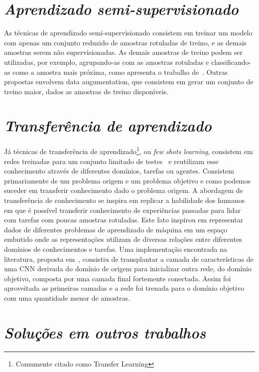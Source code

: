 \section{\textit{Aprendizado semi-supervisionado}}\label{sec:Cap2_semisup}

As técnicas de aprendizado semi-supervisionado consistem em treinar um modelo com apenas um conjunto reduzido de amostras rotuladas de treino, e as demais amostras serem não supervisionadas. As demais amostras de treino podem ser utilizadas, por exemplo, agrupando-as com as amostras rotuladas e classificando-as como a amostra mais próxima, como apresenta o trabalho de~\cite{Sanches2003}. Outras propostas envolvem data augumentation, que consistem em gerar um conjunto de treino maior, dados as amostras de treino disponíveis.

\section{\textit{Transferência de aprendizado}}\label{sec:Cap2_transfer}

Já técnicas de transferência de aprendizado\footnote{Comumente citado como Transfer Learning}, ou \textit{few shots learning}, consistem em redes treinadas para um conjunto limitado de testes~\cite{rostami2019learning}
e reutilizam esse conhecimento através de diferentes domínios, tarefas ou agentes. Consistem primariamente de um problema origem e um problema objetivo e como podemos suceder em transferir conhecimento dado o problema origem. A abordagem de transferência de conhecimento se inspira em replicar a habilidade dos humanos em que é possível transferir conhecimento de experiências passadas para lidar com tarefas com poucas amostras rotuladas. Este fato inspirou em representar dados de diferentes problemas de aprendizado de máquina em um espaço embutido onde as representações utilizam de diversas relações entre diferentes domínios de conhecimentos e tarefas. Uma implementação encontrada na literatura, proposta em~\cite{DBLP:journals/corr/abs-1811-04863}, consistiu de transplantar a camada de características de uma CNN derivada do domínio de origem para inicializar outra rede, do domínio objetivo, composta por uma camada final fortemente conectada. Assim foi aproveitada as primeiras camadas e a rede foi trenada para o domínio objetivo com uma quantidade menor de amostras.

\section{\textit{Soluções em outros trabalhos}}\label{sec:Cap2_propostas}


